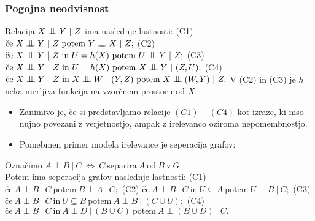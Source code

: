 \documentclass{beamer}
\newcommand{\cond}{\mathrel{\text{\scalebox{1.07}{$\perp\mkern-10mu\perp$}}}}
\begin{document}
\begin{frame}
    \frametitle{Pogojna neodvisnost}
        Relacija $ X \cond Y ~|~ Z$ ima naslednje lastnosti: \newline \newline
        (C1) $\text{če} ~X \cond Y ~|~ Z~ \text{potem}~ Y \cond X ~|~ Z;$\newline \newline
        (C2) $\text{če} ~X \cond Y ~|~ Z~ \text{in} ~U = h(X) ~\text{potem}~ U \cond Y ~|~ Z;$\newline \newline
        (C3) $\text{če} ~X \cond Y ~|~ Z~ \text{in} ~U = h(X) ~\text{potem}~ X \cond Y ~|~ (Z,U);$\newline \newline
        (C4) $\text{če} ~X \cond Y ~|~ Z~ \text{in} ~X \cond W ~|~ (Y,Z) ~\text{potem}~ X \cond (W,Y) ~|~ Z.$\newline \newline
        V (C2) in (C3) je $h$ neka merljiva funkcija na vzorčnem prostoru od $X$.

\end{frame}
\begin{frame}
    \begin{itemize}
        \item Zanimivo je, če si predstavljamo relacije $(C1)-(C4)$ kot izraze,
        ki niso nujno povezani z verjetnostjo, ampak z irelevanco oziroma nepomembnostjo.
        \item Pomebmen primer modela irelevance je seperacija grafov:
    \end{itemize}
    Označimo $A \perp B ~|~ C ~ \Longleftrightarrow ~ C ~\text{separira}~ A~ \text{od} ~B~ \text{v}~ G$ \\
    Potem ima seperacija grafov naslednje lastnosti:\newline \newline
    (C1) $\text{če} ~A \perp B ~|~ C~ \text{potem}~ B \perp A ~|~ C;$\newline \newline
    (C2) $\text{če} ~A \perp B ~|~ C~ \text{in} ~U \subseteq A ~\text{potem}~ U \perp B ~|~ C;$\newline \newline
    (C3) $\text{če} ~A \perp B ~|~ C~ \text{in} ~U \subseteq B ~\text{potem}~ A \perp B ~|~ (C \cup U);$\newline \newline
    (C4) $\text{če} ~A \perp B ~|~ C~ \text{in} ~A \perp D ~|~ (B \cup C) ~\text{potem}~ A \perp (B \cup D) ~|~ C.$\newline \newline

\end{frame}
\end{document}
